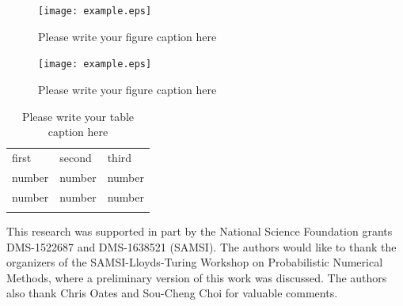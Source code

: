 \documentclass[twocolumn]{svjour3}          %
\begin{document}
\begin{figure}
  \texttt{[image: example.eps]}
\caption{Please write your figure caption here}
\label{fig:1}       %
\end{figure}
%
\begin{figure}
  \texttt{[image: example.eps]}
\caption{Please write your figure caption here}
\label{fig:2}       %
\end{figure}
%
\begin{table}
\caption{Please write your table caption here}
\label{tab:1}       %
\begin{tabular}{lll}
\hline\noalign{\smallskip}
first & second & third  \\
\noalign{\smallskip}\hline\noalign{\smallskip}
number & number & number \\
number & number & number \\
\noalign{\smallskip}\hline
\end{tabular}
\end{table}

\fi



\begin{acknowledgements}
This research was supported in part by the National Science Foundation grants DMS-1522687 and DMS-1638521 (SAMSI).
The authors would like to thank the organizers of the SAMSI-Lloyds-Turing Workshop on Probabilistic Numerical Methods, where a preliminary version of this work was discussed.  The authors also thank Chris Oates and Sou-Cheng Choi for valuable comments.
\end{acknowledgements}

\end{document}
